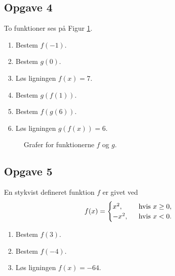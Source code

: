 \subsection*{Opgave 4}

\begin{minipage}{0.49\textwidth}
To funktioner ses på Figur \ref{fig:sammensat}. 
\begin{enumerate}[label=\roman*)]
	\item Bestem $f(-1)$.
	\item Bestem $g(0)$.
	\item Løs ligningen $f(x) = 7$.
	\item Bestem $g(f(1))$.
	\item Bestem $f(g(6))$.
	\item Løs ligningen $g(f(x)) = 6$. 
\end{enumerate}
\vspace{4cm}

\end{minipage}
\begin{minipage}{0.5\textwidth}
\begin{figure}[H]
	\centering
	\caption{Grafer for funktionerne $f$ og $g$.}
	\label{fig:sammensat}
\end{figure}
\end{minipage}



\subsection*{Opgave 5}
En stykvist defineret funktion $f$ er givet ved
\begin{align*}
	f(x) = 
	\begin{cases}
		x^2, \ &\textnormal{ hvis } x \geq 0,\\
		-x^2, \ &\textnormal{ hvis } x < 0.
	\end{cases}
\end{align*}
\begin{enumerate}[label=\roman*)]
	\item Bestem $f(3).$
	\item Bestem $f(-4).$
	\item Løs ligningen $f(x) = -64$.
\end{enumerate}

